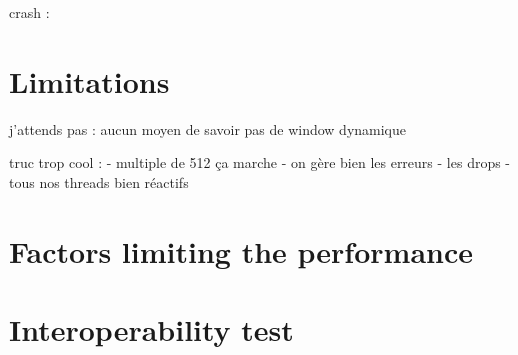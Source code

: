 \documentclass[11pt,a4paper]{article}
\begin{document}
crash : 

\section{Limitations}
j'attends pas : aucun moyen de savoir
pas de window dynamique

truc trop cool :
- multiple de 512 ça marche
- on gère bien les erreurs 
- les drops
- tous nos threads bien réactifs

\section{Factors limiting the performance}

\section{Interoperability test }


    
\end{document}
